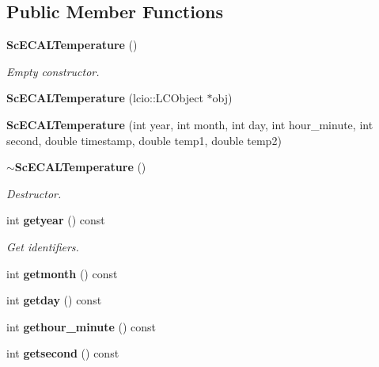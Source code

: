 \subsection*{Public Member Functions}
\begin{DoxyCompactItemize}
\item 
{\bf Sc\-E\-C\-A\-L\-Temperature} ()\label{classCALICE_1_1ScECALTemperature_a6a159b028b044032e389f42746d97478}

\begin{DoxyCompactList}\small\item\em Empty constructor. \end{DoxyCompactList}\item 
{\bfseries Sc\-E\-C\-A\-L\-Temperature} (lcio\-::\-L\-C\-Object $\ast$obj)\label{classCALICE_1_1ScECALTemperature_a6b1c5e23d94dd95e547fab76e17b110d}

\item 
{\bfseries Sc\-E\-C\-A\-L\-Temperature} (int year, int month, int day, int hour\-\_\-minute, int second, double timestamp, double temp1, double temp2)\label{classCALICE_1_1ScECALTemperature_a2d4ca499fb3c00840d0215bfe655e9b7}

\item 
{\bf $\sim$\-Sc\-E\-C\-A\-L\-Temperature} ()\label{classCALICE_1_1ScECALTemperature_ae4e2ffce5dcc6804ca921dd559eddae6}

\begin{DoxyCompactList}\small\item\em Destructor. \end{DoxyCompactList}\item 
int {\bf getyear} () const \label{classCALICE_1_1ScECALTemperature_a9e35dfe2f517cc5faf6b00ed8daa37cc}

\begin{DoxyCompactList}\small\item\em Get identifiers. \end{DoxyCompactList}\item 
int {\bfseries getmonth} () const \label{classCALICE_1_1ScECALTemperature_a0e6e6385d86355943eb3d0f966bb3d6a}

\item 
int {\bfseries getday} () const \label{classCALICE_1_1ScECALTemperature_ae131d6ad1ca5ddb4ed1c0e34fb500f85}

\item 
int {\bfseries gethour\-\_\-minute} () const \label{classCALICE_1_1ScECALTemperature_a1bb03c5bd358d4f5262e3a03f366cb66}

\item 
int {\bfseries getsecond} () const \label{classCALICE_1_1ScECALTemperature_a8c8412de6fc78542dd5f0a2476a29a06}


\end{DoxyCompactItemize}
